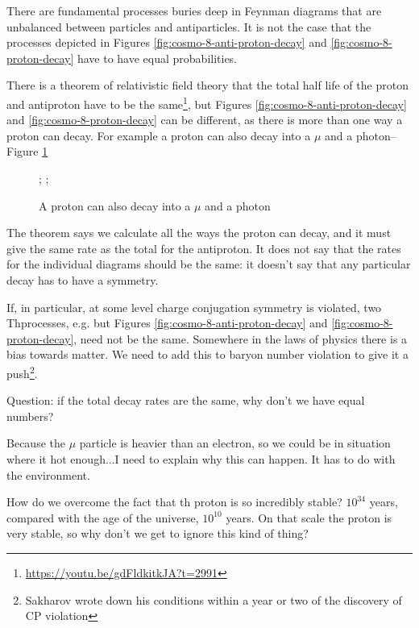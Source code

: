 \documentclass[]{article}
\begin{document}
 There are fundamental processes buries deep in Feynman diagrams that are unbalanced between particles and antiparticles. It is not the case that the processes depicted in Figures \ref{fig:cosmo-8-anti-proton-decay} and  \ref{fig:cosmo-8-proton-decay} have to have equal probabilities.
 
 There is a theorem of relativistic field theory that the total half life of the proton and antiproton have to be the same\footnote{\url{https://youtu.be/gdFldkitkJA?t=2991}}, but Figures \ref{fig:cosmo-8-anti-proton-decay} and  \ref{fig:cosmo-8-proton-decay} can be different, as there is more than one way a proton can decay. For example a proton can also decay into a $\mu$ and a photon--Figure \ref{fig:cosmo-8-muse}
 \begin{figure}[H]
 	\begin{center}
 		\caption{A proton can also decay into a $\mu$ and a photon}\label{fig:cosmo-8-muse}
 		;
 		;
 	\end{center}
 \end{figure}
 
 The theorem says we calculate all the ways the proton can decay, and it must give the same rate as the total for the antiproton. It does not say that the rates for the individual diagrams should be the same: it doesn't say that any particular decay has to have a symmetry.
 
 If, in particular, at some level charge conjugation symmetry is violated, two Thprocesses, e.g. but Figures \ref{fig:cosmo-8-anti-proton-decay} and  \ref{fig:cosmo-8-proton-decay}, need not be the same. Somewhere in the laws of physics there is a bias towards matter. We need to add this to baryon number violation to give it a push\footnote{Sakharov wrote down his conditions within a year or two of the discovery of CP violation}. 
 
 Question: if the total decay rates are the same, why don't we have equal numbers?
 
 Because the $\mu$ particle is heavier than an electron, so we could be in situation where it hot enough...I need to explain why this can happen. It has to do with the environment.
 
 How do we overcome the fact that th proton is so incredibly stable? $10^{34}$ years, compared with the age of the universe, $10^{10}$ years. On that scale the proton is very stable, so why don't we get to ignore this kind of thing?
 
\end{document}
